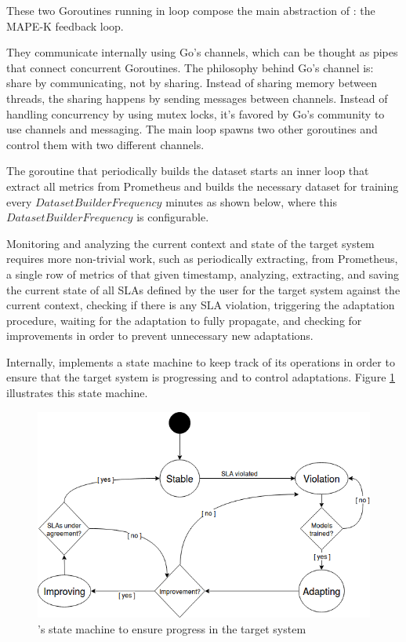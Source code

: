 These two Goroutines running in loop compose the main abstraction of \projectname{}: the MAPE-K feedback loop.

They communicate internally using Go's channels, which can be thought as pipes that connect concurrent Goroutines. The philosophy behind Go's channel is: share by communicating, not by sharing. Instead of sharing memory between threads, the sharing happens by sending messages between channels.
Instead of handling concurrency by using mutex locks, it's favored by Go's community to use channels and messaging. The main loop spawns two other goroutines and control them with two different channels.

The goroutine that periodically builds the dataset starts an inner loop that extract all metrics from Prometheus and builds the necessary dataset for training every $DatasetBuilderFrequency$ minutes as shown below, where this $DatasetBuilderFrequency$ is configurable.

Monitoring and analyzing the current context and state of the target system requires more non-trivial work, such as periodically extracting, from Prometheus, a single row of metrics of that given timestamp, analyzing, extracting, and saving the current state of all SLAs defined by the user for the target system against the current context, checking if there is any SLA violation, triggering the adaptation procedure, waiting for the adaptation to fully propagate, and checking for improvements in order to prevent unnecessary new adaptations.

Internally, \projectname{} implements a state machine to keep track of its operations in order to ensure that the target system is progressing and to control adaptations. Figure \ref{fig:statemachine} illustrates this state machine.

\begin{figure}[ht]
  \includegraphics[width=\columnwidth]{images/FinchStateMachine2.png}
  \caption{\projectname{}'s state machine to ensure progress in the target system}
  \label{fig:statemachine}
\end{figure}

